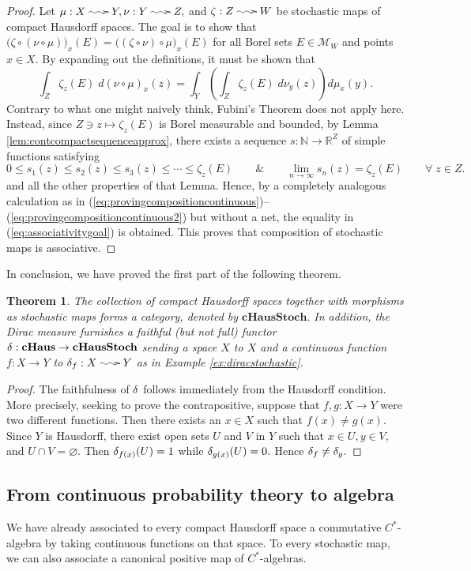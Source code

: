 \documentclass[12pt]{article}
\makeatletter
\theoremstyle{theorem}
\newtheorem{theorem}[equation]{Theorem}
\theoremstyle{definition}
\numberwithin{equation}{section}
\let\z=\zeta \let\h=\eta \let\q=\theta \let\i=\iota \let\k=\kappa
\newcommand{\be}{\begin{equation}}
\newcommand{\ee}{\end{equation}}
\newcommand{\bt}{\begin{theorem}}
\newcommand{\et}{\end{theorem}}
\newcommand{\bprf}{\begin{proof}}
\newcommand{\eprf}{\end{proof}}
\newcommand{\<}{\langle}
\renewcommand{\>}{\rangle}
\newcommand{\aand}{\qquad \& \qquad}
\def\R{{{\mathbb R}}}
\def\N{{{\mathbb N}}}
\newcommand{\cH}{\mathbf{cHaus}}
\newcommand{\cHStoch}{\mathbf{cHausStoch}}
\newcommand{\stoch}{\;\xy0;/r.25pc/:\ar@{~>}(3,0);(-3,0);\endxy\;}
\makeatother
\begin{document}
\bprf
Let $\mu:X\stoch Y,\nu:Y\stoch Z,$ and $\z:Z\stoch W$ be stochastic maps
of compact Hausdorff spaces.
The goal is to show that 
$\big(\z\circ(\nu\circ\mu)\big)_{x}(E)=\big((\z\circ\nu)\circ\mu\big)_{x}(E)$
for all Borel sets $E\in\mathcal{M}_{W}$ and points $x\in X.$ 
By expanding out the definitions, it must be shown that
\be
\label{eq:associativitygoal}
\int_{Z}\z_{z}(E)\;d(\nu\circ\mu)_{x}(z)=\int_{Y}\left(\int_{Z}\z_{z}(E)\;d\nu_{y}(z)\right)d\mu_{x}(y).
\ee
Contrary to what one might naively think, Fubini's Theorem does not apply 
here. Instead, since $Z\ni z\mapsto\z_{z}(E)$ is Borel measurable
and bounded, 
by Lemma \ref{lem:contcompactsequenceapprox}, there exists a 
sequence $s:\N\to \R^{Z}$ of simple functions satisfying
\be
0\le s_1(z)\le s_2(z)\le s_3(z)\le\cdots\le\z_{z}(E)
\aand
\lim_{n\to\infty}s_{n}(z)=\z_{z}(E)\qquad\forall\;z\in Z. 
\ee
and all the other properties of that Lemma.
Hence, by a completely analogous 
calculation as in (\ref{eq:provingcompositioncontinuous})--(\ref{eq:provingcompositioncontinuous2}) but without a net, 
the equality in (\ref{eq:associativitygoal}) is obtained. 
This proves that composition of stochastic maps is associative. 
\eprf

In conclusion, we have proved the first part of the following theorem. 

\bt
\label{thm:cHStoch}
The collection of compact Hausdorff spaces together with
morphisms as stochastic maps forms a category, 
denoted by $\cHStoch.$ In addition, the Dirac measure
furnishes a faithful (but not full) 
functor $\de:\cH\to\cHStoch$ sending a space $X$ to $X$
and a continuous function $f:X\to Y$ to $\de_{f}:X\stoch Y$ 
as in Example \ref{ex:diracstochastic}. 
\et

\bprf
The faithfulness of $\delta$ follows immediately from the Hausdorff condition.
More precisely, seeking to prove the contrapositive, 
suppose that $f,g:X\to Y$ were two
different functions. Then there exists an $x\in X$ such that $f(x)\ne g(x).$ 
Since $Y$ is Hausdorff, there exist open sets $U$ and $V$ in $Y$ such that
$x\in U, y\in V,$ and $U\cap V=\varnothing.$ Then $\delta_{f(x)}(U)=1$ while
$\delta_{g(x)}(U)=0.$ Hence $\delta_{f}\ne\delta_{g}.$ 
\eprf

\subsection{From continuous probability theory to algebra}
\label{sec:stochasticCfunctor}

We have already associated to every compact Hausdorff
space a commutative $C^*$-algebra by taking 
continuous functions on that space. 
To every stochastic map, we can
also associate a canonical positive map of $C^*$-algebras. 
\end{document}
